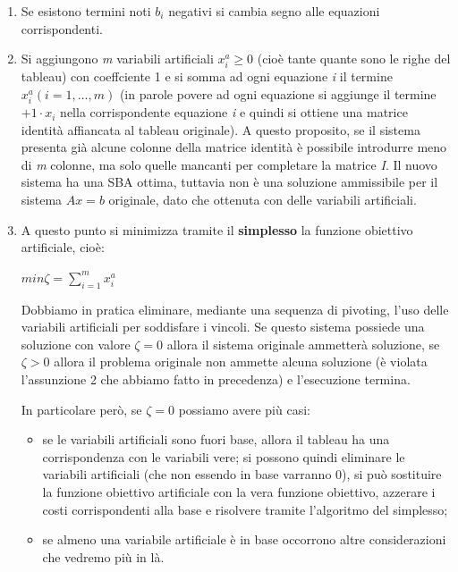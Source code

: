 \documentclass[11pt]{book}
\begin{document}
\begin{enumerate}
  
\item Se esistono termini noti $b_i$ negativi si cambia segno alle
  equazioni corrispondenti.

\item Si aggiungono {\em m} variabili artificiali $x_i^a \geq 0$
  (cio\`e tante quante sono le righe del tableau) con coeffciente 1 e
  si somma ad ogni equazione {\em i} il termine $x_i^a (i=1,\dots,m)$
  (in parole povere ad ogni equazione si aggiunge il termine $+ 1
  \cdot x_i$ nella corrispondente equazione {\em i} e quindi si
  ottiene una matrice identit\`a affiancata al tableau originale). A
  questo proposito, se il sistema presenta gi\`a alcune colonne della
  matrice identit\`a \`e possibile introdurre meno di {\em m} colonne,
  ma solo quelle mancanti per completare la matrice {\em I}. Il nuovo
  sistema ha una SBA ottima, tuttavia non \`e una soluzione
  ammissibile per il sistema $Ax=b$ originale, dato che ottenuta con
  delle variabili artificiali.

\item A questo punto si minimizza tramite il {\bf simplesso} la
  funzione obiettivo artificiale, cio\`e:

  \begin{center}
    $min \zeta = \sum\limits_{i=1}^m x_i^a$
  \end{center}

  Dobbiamo in pratica eliminare, mediante una sequenza di pivoting,
  l'uso delle variabili artificiali per soddisfare i vincoli. Se
  questo sistema possiede una soluzione con valore $\zeta = 0$ allora
  il sistema originale ammetter\`a soluzione, se $\zeta > 0$ allora il
  problema originale non ammette alcuna soluzione (\`e violata
  l'assunzione 2 che abbiamo fatto in precedenza) e l'esecuzione
  termina.

  In particolare per\`o, se $\zeta = 0$ possiamo avere pi\`u casi:
  
  \begin{itemize}
  \item se le variabili artificiali sono fuori base, allora il tableau
    ha una corrispondenza con le variabili vere; si possono quindi
    eliminare le variabili artificiali (che non essendo in base
    varranno 0), si pu\`o sostituire la funzione obiettivo artificiale
    con la vera funzione obiettivo, azzerare i costi corrispondenti
    alla base e risolvere tramite l'algoritmo del simplesso;

  \item se almeno una variabile artificiale \`e in base occorrono
    altre considerazioni che vedremo pi\`u in l\`a.
  \end{itemize}

\end{enumerate}
\end{document}
